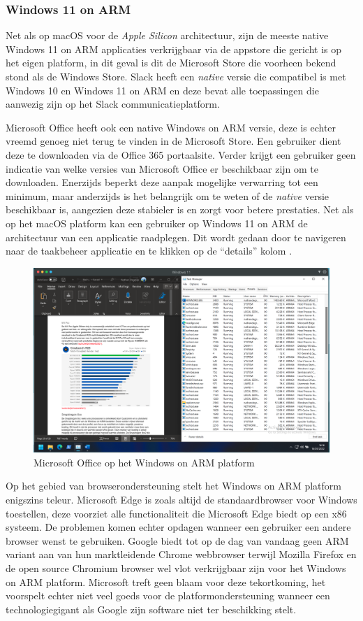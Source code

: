 \subsubsection{Windows 11 on ARM}
Net als op macOS voor de \textit{Apple Silicon} architectuur, zijn de meeste native Windows 11 on ARM applicaties verkrijgbaar via de appstore die gericht is op het eigen platform, in dit geval is dit de Microsoft Store die voorheen bekend stond als de Windows Store. Slack heeft een \textit{native} versie die compatibel is met Windows 10 en Windows 11 on ARM en deze bevat alle toepassingen die aanwezig zijn op het Slack communicatieplatform.

Microsoft Office heeft ook een native Windows on ARM versie, deze is echter vreemd genoeg niet terug te vinden in de Microsoft Store. Een gebruiker dient deze te downloaden via de Office 365 portaalsite. Verder krijgt een gebruiker geen indicatie van welke versies van Microsoft Office er beschikbaar zijn om te downloaden. Enerzijds beperkt deze aanpak mogelijke verwarring tot een minimum, maar anderzijds is het belangrijk om te weten of de \textit{native} versie beschikbaar is, aangezien deze stabieler is en zorgt voor betere prestaties. Net als op het macOS platform kan een gebruiker op Windows 11 on ARM de architectuur van een applicatie raadplegen. Dit wordt gedaan door te navigeren naar de taakbeheer applicatie en te klikken op de “details” kolom \autocite{Venkat2020}.

\begin{figure}[!h]
	\centering
	\includegraphics[width=\linewidth]{img/office_winARM.png}
	\caption{Microsoft Office op het Windows on ARM platform}
\end{figure}

Op het gebied van browserondersteuning stelt het Windows on ARM platform enigszins teleur. Microsoft Edge is zoals altijd de standaardbrowser voor Windows toestellen, deze voorziet alle functionaliteit die Microsoft Edge biedt op een x86 systeem. De problemen komen echter opdagen wanneer een gebruiker een andere browser wenst te gebruiken. Google biedt tot op de dag van vandaag geen ARM variant aan van hun marktleidende Chrome webbrowser terwijl Mozilla Firefox en de open source Chromium browser wel vlot verkrijgbaar zijn voor het Windows on ARM platform. Microsoft treft geen blaam voor deze tekortkoming, het voorspelt echter niet veel goeds voor de platformondersteuning wanneer een technologiegigant als Google zijn software niet ter beschikking stelt.

